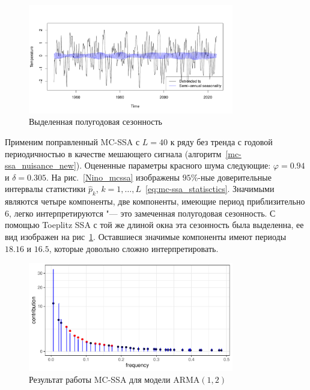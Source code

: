 \documentclass[specialist,
substylefile = spbu_report.rtx,
subf,href,colorlinks=true, 12pt]{disser}
\theoremstyle{definition}
\begin{document}
\begin{figure}
	\centering
	\includegraphics[width=0.8\textwidth]{img/Nino_reconstruct_semi_annual.pdf}
	\caption{Выделенная полугодовая сезонность}
	\label{Nino_reconstruct_semi_annual}
\end{figure}

Применим поправленный MC-SSA с $L=40$ к ряду без тренда с годовой периодичностью в качестве мешающего сигнала (алгоритм~\ref{mc-ssa_nuisance_new}). Оцененные параметры красного шума следующие: $\varphi=0.94$ и $\delta=0.305$. На рис.~\ref{Nino_mcssa} изображены $95\%$-ные доверительные интервалы статистики $\hat p_k$, $k=1,\ldots,L$~\eqref{eq:mc-ssa_statisctics}. Значимыми являются четыре компоненты, две компоненты, имеющие период приблизительно $6$, легко интерпретируются "---  это замеченная полугодовая сезонность. С помощью Toeplitz SSA с той же длиной окна эта сезонность была выделенна, ее вид изображен на рис~\ref{Nino_reconstruct_semi_annual}. Оставшиеся значимые компоненты имеют периоды $18.16$ и $16.5$, которые довольно сложно интерпретировать.
\begin{figure}
	\centering
	\includegraphics[width=0.8\textwidth]{img/Nino_mcssa_arma12.pdf}
	\caption{Результат работы MC-SSA для модели ARMA$(1,2)$}
	\label{Nino_mcssa_arma12}
\end{figure}
\end{document}
